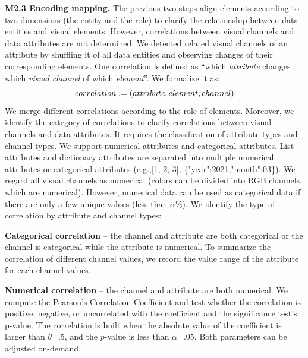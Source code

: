 {\bf M2.3 Encoding mapping.}\label{sec:encodingmapping}
The previous two steps align elements according to two dimensions (the entity and the role) to clarify the relationship between data entities and visual elements.
However, correlations between visual channels and data attributes are not determined.
We detected related visual channels of an attribute by shuffling it of  all data entities and observing changes of their corresponding elements.
One correlation is defined as ``which \textit{attribute} changes which \textit{visual channel} of which \textit{element}''. We formalize it as:
\begin{equation}
    \abovedisplayskip=5pt
    \abovedisplayshortskip=5pt
    \belowdisplayskip=5pt
    \belowdisplayshortskip=5pt
    correlation := ( attribute, element, channel )
\end{equation}
We merge different correlations according to the role of elements.
Moreover, we identify the category of correlations to clarify correlations between visual channels and data attributes.
It requires the classification of attribute types and channel types.
We support numerical attributes and categorical attributes.
List attributes and dictionary attributes are separated into multiple numerical attributes or categorical attributes (e.g.,[1, 2, 3], \{"year":2021,"month":03\}).
We regard all visual channels as numerical (colors can be divided into RGB channels, which are numerical).
However, numerical data can be used as categorical data if there are only a few unique values (less than $\alpha\%$).
We identify the type of correlation by attribute and channel types:

\noindent \textbf{Categorical correlation} -- the channel and attribute are both categorical or the channel is categorical while the attribute is numerical. 
To summarize the correlation of different channel values, we record the value range of the attribute for each channel values.
    
\noindent \textbf{Numerical correlation} -- the channel and attribute are both numerical. We compute the Pearson's Correlation Coefficient and test whether the correlation is positive, negative, or uncorrelated with the coefficient and the significance test's p-value.  The correlation is built when the absolute value of the coefficient is larger than $\theta$=.5, and the $p$-value is less than $\alpha$=.05. Both parameters can be adjusted on-demand.


